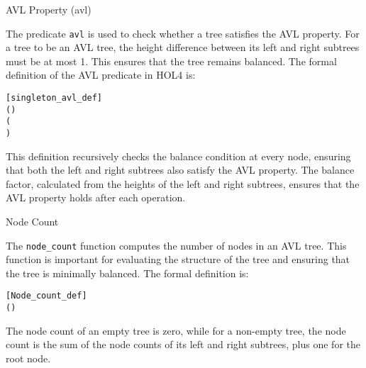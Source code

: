 \begin{defn}{AVL Property (avl)}

The predicate \texttt{avl} is used to check whether a tree satisfies the AVL property. For a tree to be an AVL tree, the height difference between its left and right subtrees must be at most 1. This ensures that the tree remains balanced. The formal definition of the AVL predicate in HOL4 is:

\begin{alltt}
	[singleton_avl_def]
	  \HOLTokenDefEquality{} 
 (     ) \HOLTokenDefEquality{}
  (  \HOLSymConst{=}   \HOLSymConst{\HOLTokenDisj{}}   \HOLSymConst{=}   \HOLSymConst{\ensuremath{+}}  \HOLSymConst{\HOLTokenDisj{}}
     \HOLSymConst{=}   \HOLSymConst{\ensuremath{+}} ) \HOLSymConst{\HOLTokenConj{}}  \HOLSymConst{=} \HOLSymConst{\&}  \HOLSymConst{\ensuremath{-}} \HOLSymConst{\&}  \HOLSymConst{\HOLTokenConj{}}
    \HOLSymConst{\HOLTokenConj{}}  
\end{alltt}

This definition recursively checks the balance condition at every node, ensuring that both the left and right subtrees also satisfy the AVL property. The balance factor, calculated from the heights of the left and right subtrees, ensures that the AVL property holds after each operation.
\end{defn}


\begin{defn}{Node Count}

The \texttt{node\_count} function computes the number of nodes in an AVL tree. This function is important for evaluating the structure of the tree and ensuring that the tree is minimally balanced. The formal definition is:

\begin{alltt}
	[Node_count_def]
	  \HOLTokenDefEquality{} 
 (     ) \HOLTokenDefEquality{}   \HOLSymConst{\ensuremath{+}}   \HOLSymConst{\ensuremath{+}} 
\end{alltt}

The node count of an empty tree is zero, while for a non-empty tree, the node count is the sum of the node counts of its left and right subtrees, plus one for the root node.
\end{defn}



